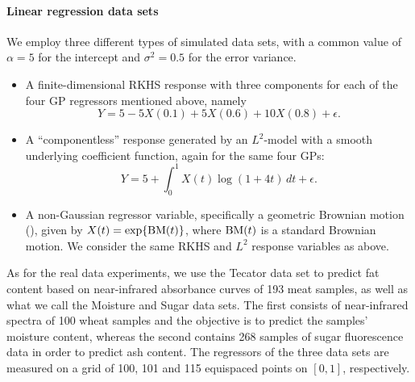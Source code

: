 \paragraph{Linear regression data sets} We employ three different types of simulated data sets, with a common value of \(\alpha=5\) for the intercept and \(\sigma^2=0.5\) for the error variance.
\begin{itemize}
  \item A finite-dimensional \acs{RKHS} response with three components for each of the four \acs{GP} regressors mentioned above, namely
  \[
    Y=5 -5X(0.1) + 5X(0.6) + 10X(0.8) + \epsilon.
  \]
  \item A ``componentless'' response generated by an \(L^2\)-model with a smooth underlying coefficient function, again for the same four \acs{GPs}:
  \[
    Y = 5 + \int_0^1 X(t)\log(1+4t)\, dt + \epsilon.
  \]
  \item A non-Gaussian regressor variable, specifically a geometric Brownian motion (), given by \(X(t)=\exp\{\operatorname{BM}(t)\}\), where \(\operatorname{BM}(t)\) is a standard Brownian motion. We consider the same \acs{RKHS} and \(L^2\) response variables as above.
\end{itemize}
As for the real data experiments, we use the Tecator data set \citep{borggaard1992optimal} to predict fat content based on near-infrared absorbance curves of 193 meat samples, as well as what we call the Moisture \citep{kalivas1997two} and Sugar \citep{bro1999exploratory} data sets. The first consists of near-infrared spectra of 100 wheat samples and the objective is to predict the samples' moisture content, whereas the second contains 268 samples of sugar fluorescence data in order to predict ash content. The regressors of the three data sets are measured on a grid of 100, 101 and 115 equispaced points on \([0, 1]\), respectively.

